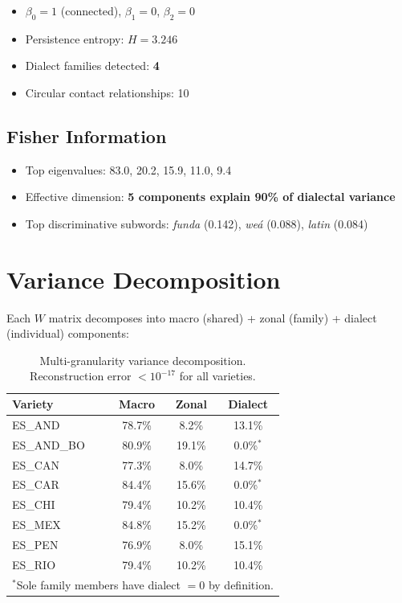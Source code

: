 \documentclass[11pt,a4paper]{article}
\begin{document}
\begin{itemize}[nosep]
\item $\beta_0 = 1$ (connected), $\beta_1 = 0$, $\beta_2 = 0$
\item Persistence entropy: $H = 3.246$
\item Dialect families detected: \textbf{4}
\item Circular contact relationships: 10
\end{itemize}

\subsection{Fisher Information}

\begin{itemize}[nosep]
\item Top eigenvalues: 83.0, 20.2, 15.9, 11.0, 9.4
\item Effective dimension: \textbf{5 components explain 90\% of dialectal variance}
\item Top discriminative subwords: \emph{funda} (0.142), \emph{we\'a} (0.088), \emph{latin} (0.084)
\end{itemize}

\section{Variance Decomposition}

Each $W$ matrix decomposes into macro (shared) + zonal (family) + dialect (individual) components:

\begin{table}[H]
\centering
\begin{tabular}{@{}lccc@{}}
\toprule
\textbf{Variety} & \textbf{Macro} & \textbf{Zonal} & \textbf{Dialect} \\
\midrule
ES\_AND & 78.7\% & 8.2\% & 13.1\% \\
ES\_AND\_BO & 80.9\% & 19.1\% & 0.0\%$^*$ \\
ES\_CAN & 77.3\% & 8.0\% & 14.7\% \\
ES\_CAR & 84.4\% & 15.6\% & 0.0\%$^*$ \\
ES\_CHI & 79.4\% & 10.2\% & 10.4\% \\
ES\_MEX & 84.8\% & 15.2\% & 0.0\%$^*$ \\
ES\_PEN & 76.9\% & 8.0\% & 15.1\% \\
ES\_RIO & 79.4\% & 10.2\% & 10.4\% \\
\bottomrule
\multicolumn{4}{l}{\footnotesize $^*$Sole family members have dialect $= 0$ by definition.}
\end{tabular}
\caption{Multi-granularity variance decomposition. Reconstruction error $< 10^{-17}$ for all varieties.}
\end{table}
\end{document}
